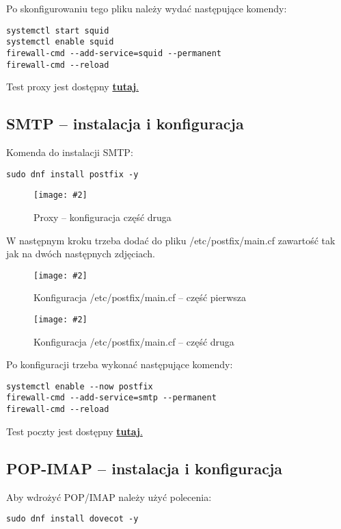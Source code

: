 \documentclass[a4paper]{article}
\newcommand*{\zdj}[2][\textwidth]{\texttt{[image: \#2]}}
\newcommand*{\fg}[4][!htb]{
      \begin{figure*}[#1]
            \zdj{#2}
            \caption[#4]{#3}
      \end{figure*}
}
\begin{document}
\vspace*{-10pt}
Po skonfigurowaniu tego pliku należy wydać następujące komendy:
\begin{Verbatim}[frame=single]
systemctl start squid
systemctl enable squid
firewall-cmd --add-service=squid --permanent
firewall-cmd --reload
\end{Verbatim}

\vspace*{-5pt}
Test proxy jest dostępny \hyperref[fig:proxy-test]{\textbf{tutaj}.}

\vspace*{-10pt}
\subsection{SMTP – instalacja i konfiguracja}
\vspace*{-5pt}
Komenda do instalacji SMTP:
\begin{Verbatim}[frame=single]
      sudo dnf install postfix -y
\end{Verbatim}
\vspace*{-10pt}
\fg{contents/configuration/SMTP/1.png}{Proxy – konfiguracja część druga}{Proxy – konfiguracja część druga}
\newpage

W następnym kroku trzeba dodać do pliku /etc/postfix/main.cf zawartość tak jak na dwóch następnych zdjęciach.
\fg{contents/configuration/SMTP/3.png}{Konfiguracja /etc/postfix/main.cf – część pierwsza}{Konfiguracja /etc/postfix/main.cf – część pierwsza}
\fg{contents/configuration/SMTP/4.png}{Konfiguracja /etc/postfix/main.cf – część druga}{Konfiguracja /etc/postfix/main.cf – część druga}

Po konfiguracji trzeba wykonać następujące komendy:
\begin{Verbatim}[frame=single]
systemctl enable --now postfix
firewall-cmd --add-service=smtp --permanent
firewall-cmd --reload
\end{Verbatim}
Test poczty jest dostępny \hyperref[fig:poczta-test]{\textbf{tutaj}.}

\newpage
\subsection{POP-IMAP – instalacja i konfiguracja}
Aby wdrożyć POP/IMAP należy użyć polecenia:
\begin{Verbatim}[frame=single]
sudo dnf install dovecot -y
\end{Verbatim}
\end{document}
